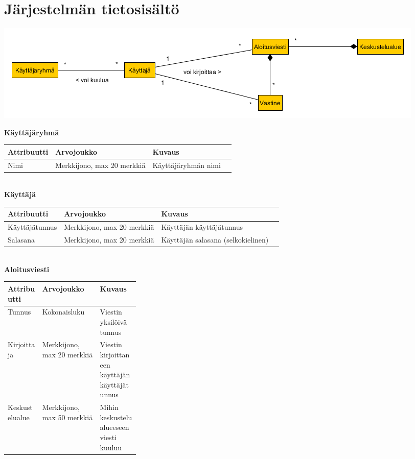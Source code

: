 \documentclass[12pt,a4paper,leqno]{report}
\begin{document}
\chapter{Järjestelmän tietosisältö}

\begin{center}
\includegraphics[scale=0.55]{tietosisaltokaavio}
\end{center}

\renewcommand{\arraystretch}{1.5}

\noindent \textbf{Käyttäjäryhmä}

\begin{center}
\begin{tabular}{| l | l | l | l |}
\hline
\textbf{Attribuutti} & \textbf{Arvojoukko} & \textbf{Kuvaus} \\ \hline
Nimi & Merkkijono, max 20 merkkiä & Käyttäjäryhmän nimi \\ \hline
\end{tabular}
\end{center}
\ \\

\noindent \textbf{Käyttäjä}

\begin{center}
\begin{tabular}{| l | l | l | l |}
\hline
\textbf{Attribuutti} & \textbf{Arvojoukko} & \textbf{Kuvaus} \\ \hline
Käyttäjätunnus & Merkkijono, max 20 merkkiä & Käyttäjän käyttäjätunnus \\ \hline
Salasana & Merkkijono, max 20 merkkiä & Käyttäjän salasana (selkokielinen) \\ \hline
\end{tabular}
\end{center}
\ \\

 \noindent \textbf{Aloitusviesti}

\begin{center}
\begin{tabular}{| l | l |m{0.3\linewidth}|}
\hline
\textbf{Attribuutti} & \textbf{Arvojoukko} & \textbf{Kuvaus} \\ \hline
Tunnus & Kokonaisluku & Viestin yksilöivä tunnus \\ \hline
Kirjoittaja & Merkkijono, max 20 merkkiä & Viestin kirjoittaneen käyttäjän käyttäjätunnus \\ \hline
Keskustelualue & Merkkijono, max 50 merkkiä & Mihin keskustelualueeseen viesti kuuluu \\ \hline
\end{tabular}
\end{center}
\ \\
\end{document}
